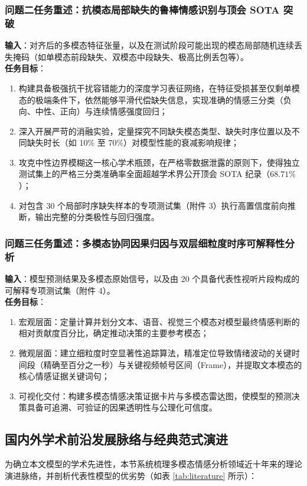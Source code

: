 \subsubsection{问题二任务重述：抗模态局部缺失的鲁棒情感识别与顶会 SOTA 突破}
\textbf{输入}：对齐后的多模态特征张量，以及在测试阶段可能出现的模态局部随机连续丢失掩码（如单模态前段缺失、双模态中段缺失、极高比例丢包等）。\\
\textbf{任务目标}：
\begin{enumerate}
    \item 构建具备极强抗干扰容错能力的深度学习表征网络，在特征受损甚至仅剩单模态的极端条件下，依然能够平滑代偿缺失信息，实现准确的情感三分类（负向、中性、正向）与连续情感强度回归；
    \item 深入开展严苛的消融实验，定量探究不同缺失模态类型、缺失时序位置以及不同缺失时长（如 10\% 至 70\%）对模型性能的衰减影响规律；
    \item 攻克中性边界模糊这一核心学术瓶颈，在严格零数据泄露的原则下，使得独立测试集上的严格三分类准确率全面超越学术界公开顶会 SOTA 纪录（$68.71\%$）；
    \item 对包含 30 个局部时序缺失样本的专项测试集（附件 3）执行高置信度前向推断，输出完整的分类极性与回归强度。
\end{enumerate}

\subsubsection{问题三任务重述：多模态协同因果归因与双层细粒度时序可解释性分析}
\textbf{输入}：模型预测结果及多模态原始信号，以及由 20 个具备代表性视听片段构成的可解释专项测试集（附件 4）。\\
\textbf{任务目标}：
\begin{enumerate}
    \item 宏观层面：定量计算并划分文本、语音、视觉三个模态对模型最终情感判断的相对贡献度百分比，确定推动决策的主要参考模态；
    \item 微观层面：建立细粒度时空显著性追踪算法，精准定位导致情绪波动的关键时间段（精确至百分之一秒）与关键视频帧号区间（Frame），并提取文本模态的核心情感证据关键词句；
    \item 可视化交付：构建多模态情感决策证据卡片与多模态雷达图，使模型的预测决策具备可追溯、可验证的因果透明性与公理化可信度。
\end{enumerate}

\subsection{国内外学术前沿发展脉络与经典范式演进}
为确立本文模型的学术先进性，本节系统梳理多模态情感分析领域近十年来的理论演进脉络，并剖析代表性模型的优劣势（如表 \ref{tab:literature} 所示）：

